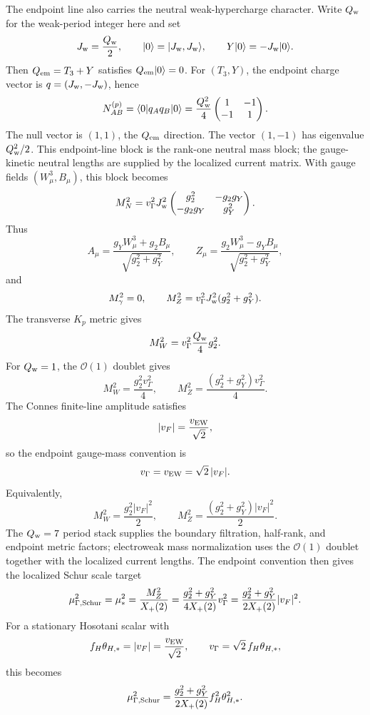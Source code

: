 \documentclass[11pt]{article}
\theoremstyle{definition}
\theoremstyle{remark}
\newcommand{\Xp}{X_+}
\begin{document}
The endpoint line also carries the neutral weak-hypercharge character.  Write
\(Q_{\rm w}\) for the weak-period integer here and set
\[
  J_{\rm w}=\frac{Q_{\rm w}}2,\qquad |0\rangle=|J_{\rm w},J_{\rm w}\rangle,
  \qquad
  Y|0\rangle=-J_{\rm w}|0\rangle .
\]
Then \(Q_{\rm em}=T_3+Y\) satisfies \(Q_{\rm em}|0\rangle=0\).  For
\((T_3,Y)\), the endpoint charge vector is \(q=(J_{\rm w},-J_{\rm w})\), hence
\[
  N_{AB}^{(p)}
  =
  \langle0|q_Aq_B|0\rangle
  =
  \frac{Q_{\rm w}^2}{4}
  \begin{pmatrix}
  1&-1\\
  -1&1
  \end{pmatrix}.
\]
The null vector is \((1,1)\), the \(Q_{\rm em}\) direction.  The vector
\((1,-1)\) has eigenvalue \(Q_{\rm w}^2/2\).  This endpoint-line block is the
rank-one neutral mass block; the gauge-kinetic neutral lengths are supplied by
the localized current matrix.
With gauge fields \((W^3_\mu,B_\mu)\), this block becomes
\[
  M_N^2
  =
  v_\Gamma^2J_{\rm w}^2
  \begin{pmatrix}
  g_2^2&-g_2g_Y\\
  -g_2g_Y&g_Y^2
  \end{pmatrix}.
\]
Thus
\[
  A_\mu=\frac{g_YW^3_\mu+g_2B_\mu}{\sqrt{g_2^2+g_Y^2}},
  \qquad
  Z_\mu=\frac{g_2W^3_\mu-g_YB_\mu}{\sqrt{g_2^2+g_Y^2}},
\]
and
\[
  M_\gamma^2=0,\qquad
  M_Z^2=v_\Gamma^2J_{\rm w}^2(g_2^2+g_Y^2).
\]
The transverse \(K_p\) metric gives
\[
  M_W^2=v_\Gamma^2\frac{Q_{\rm w}}4g_2^2.
\]
For \(Q_{\rm w}=1\), the \(\mathcal O(1)\) doublet gives
\[
  M_W^2=\frac{g_2^2v_\Gamma^2}{4},
  \qquad
  M_Z^2=\frac{(g_2^2+g_Y^2)v_\Gamma^2}{4}.
\]
The Connes finite-line amplitude satisfies
\[
  |v_F|=\frac{v_{\rm EW}}{\sqrt2},
\]
so the endpoint gauge-mass convention is
\[
  v_\Gamma=v_{\rm EW}=\sqrt2\,|v_F|.
\]
Equivalently,
\[
  M_W^2=\frac{g_2^2|v_F|^2}{2},
  \qquad
  M_Z^2=\frac{(g_2^2+g_Y^2)|v_F|^2}{2}.
\]
The \(Q_{\rm w}=7\) period stack supplies the boundary filtration, half-rank,
and endpoint metric factors; electroweak mass normalization uses the
\(\mathcal O(1)\) doublet together with the localized current lengths.
The endpoint convention then gives the localized Schur scale target
\[
  \mu_{\Gamma,{\rm Schur}}^2
  =
  \mu_*^2
  =
  \frac{M_Z^2}{\Xp(2)}
  =
  \frac{g_2^2+g_Y^2}{4\Xp(2)}v_\Gamma^2
  =
  \frac{g_2^2+g_Y^2}{2\Xp(2)}|v_F|^2 .
\]
For a stationary Hosotani scalar with
\[
  f_H\theta_{H,*}=|v_F|=\frac{v_{\rm EW}}{\sqrt2},
  \qquad
  v_\Gamma=\sqrt2\,f_H\theta_{H,*},
\]
this becomes
\[
  \mu_{\Gamma,{\rm Schur}}^2
  =
  \frac{g_2^2+g_Y^2}{2\Xp(2)}f_H^2\theta_{H,*}^2 .
\]
\end{document}
